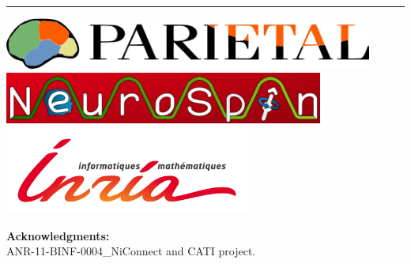 \documentclass[portrait,a0,final]{a0poster} %
\begin{document}
\begin{minipage}{0.98\textwidth} %

\large %

\begin{minipage}[c]{0.475\linewidth}%
\vspace{0pt}
\begin{center}
\textcolor{posterGray}{\hrule}
\vspace{0pt}
\includegraphics[height=17mm, angle=0]{figures/logos/parietal_web_page.png}
\qquad \quad
\includegraphics[height=17mm, angle=0]{figures/logos/neurospin.jpg}
\qquad \quad
\includegraphics[height=29mm, angle=0]{figures/logos/logo-inria2.jpg}
\end{center}
\end{minipage} %
\hspace{0.01\linewidth}
\begin{minipage}[c]{0.575\linewidth} %
    \begin{center}
\vspace{0pt}
\textbf{\sffamily Acknowledgments:}\\
ANR-11-BINF-0004\_NiConnect and
CATI project.
\end{center}
\end{minipage}

\end{minipage}





\vspace*{0.03\linewidth} %
\end{document}

